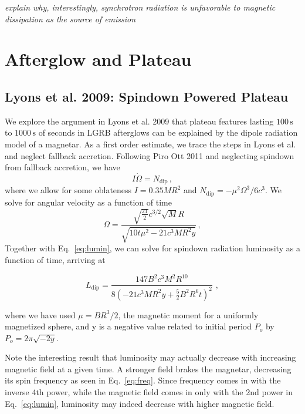 \documentclass{article}
\begin{document}
\textit{explain why, interestingly, synchrotron radiation is unfavorable to magnetic dissipation as the source of emission}

\section{Afterglow and Plateau}

\subsection{Lyons et al. 2009: Spindown Powered Plateau}
We explore the argument in Lyons et al. 2009 \cite{Lyons:2009ka} that plateau features lasting $100\,\mathrm{s}$ to $1000\,\mathrm{s}$ of seconds in LGRB afterglows can be explained by the dipole radiation model of a magnetar.
As a first order estimate, we trace the steps in Lyons et al. and neglect fallback accretion. Following Piro Ott 2011 \cite{Piro:2011ed} and neglecting spindown from fallback accretion, we have
\begin{equation} I \dot{\Omega}=N_{\mathrm{dip}}\,, \end{equation}
where we allow for some oblateness  $I= 0.35 M R^2$\cite{Lattimer:2001ap} and $N_{\mathrm{dip}}= -\mu ^2 \Omega^3/6c^3$.
We solve for angular velocity as a function of time
\begin{equation}\label{eq:freq}
\Omega = \frac{\sqrt{\frac{21}{2}} c^{3/2} \sqrt{M} R}{\sqrt{10 t\mu^2 - 21 c^3 M R^2 y}}\,,
\end{equation}
Together with Eq.~\ref{eq:lumin}, we can solve for spindown radiation luminosity as a function of time, arriving at

\begin{equation}
L_{\mathrm{dip}}=\frac{147 B^2 c^3 M^2 R^{10}}{8(-21 c^3 M R^2 y+ \frac{5}{2} B^2 R^6 t)^2}\,\,,
\end{equation}

where we have used $\mu= B R^3/2$, the magnetic moment for a uniformly magnetized sphere, and y is a negative value related to initial period $P_o$ by $P_o= 2\pi \sqrt{-2 y}$.

\hspace{4cm}

Note the interesting result that luminosity may actually decrease with increasing magnetic field at a given time. A stronger field brakes the magnetar, decreasing its spin frequency as seen in Eq.~\ref{eq:freq}. Since frequency comes in with the inverse 4th power, while the magnetic field comes in only with the 2nd power in Eq.~\ref{eq:lumin}, luminosity may indeed decrease with higher magnetic field.
\end{document}
